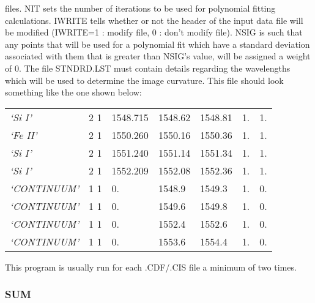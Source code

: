    files. NIT sets the number of iterations to be used for polynomial
   fitting calculations.  IWRITE tells whether or not the header of the
   input data file will be modified (IWRITE=1 : modify file, 0 : don't
   modify file).  NSIG is such that any points that will be used for a
   polynomial fit which have a standard deviation associated with them
   that is greater than NSIG's value, will be assigned a weight of 0.
      The file STNDRD.LST must contain details regarding the wavelengths
   which will be used to determine the image curvature.  This file should
   look something like the one shown below:
\begin{center}
\begin{tabular}{||l l l l l l l||}      
\hline   
    {\em `Si I'}      &  2 1 & 1548.715 &  1548.62 &  1548.81 &   1.&   1. \\ 
    {\em `Fe II'}     &  2 1 & 1550.260 &  1550.16 &  1550.36 &   1.&   1. \\ 
    {\em `Si I'}      &  2 1 & 1551.240 &  1551.14 &  1551.34 &   1.&   1. \\ 
    {\em `Si I'}      &  2 1 & 1552.209 &  1552.08 &  1552.36 &   1.&   1. \\ 
    {\em `CONTINUUM'} &  1 1 &    0.    &  1548.9  &  1549.3  &   1.&   0. \\ 
    {\em `CONTINUUM'} &  1 1 &    0.    &  1549.6  &  1549.8  &   1.&   0. \\ 
    {\em `CONTINUUM'} &  1 1 &    0.    &  1552.4  &  1552.6  &   1.&   0. \\ 
    {\em `CONTINUUM'} &  1 1 &    0.    &  1553.6  &  1554.4  &   1.&   0. \\ 
\hline
\end{tabular}
\end{center}
      This program is usually run for each .CDF/.CIS file a minimum of two
   times.

\subsubsection{SUM}

